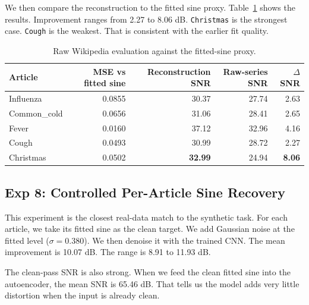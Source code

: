 \documentclass{article}
\begin{document}
We then compare the reconstruction to the fitted sine proxy. Table~\ref{tab:real-eval} shows the results. Improvement ranges from 2.27 to 8.06 dB. \texttt{Christmas} is the strongest case. \texttt{Cough} is the weakest. That is consistent with the earlier fit quality.

\begin{table}[!htbp]
\centering
\caption{Raw Wikipedia evaluation against the fitted-sine proxy.}
\label{tab:real-eval}
\begin{tabular}{lrrrr}
\toprule
Article & MSE vs fitted sine & Reconstruction SNR & Raw-series SNR & $\Delta$SNR \\
\midrule
Influenza    & 0.0855 & 30.37          & 27.74 & 2.63          \\
Common\_cold & 0.0656 & 31.06          & 28.41 & 2.65          \\
Fever        & 0.0160 & 37.12          & 32.96 & 4.16          \\
Cough        & 0.0493 & 30.99          & 28.72 & 2.27          \\
Christmas    & 0.0502 & \textbf{32.99} & 24.94 & \textbf{8.06} \\
\bottomrule
\end{tabular}
\end{table}

\FloatBarrier

\subsection{Exp 8: Controlled Per-Article Sine Recovery}

This experiment is the closest real-data match to the synthetic task. For each article, we take its fitted sine as the clean target. We add Gaussian noise at the fitted level ($\sigma = 0.380$). We then denoise it with the trained CNN. The mean improvement is 10.07 dB. The range is 8.91 to 11.93 dB.

The clean-pass SNR is also strong. When we feed the clean fitted sine into the autoencoder, the mean SNR is 65.46 dB. That tells us the model adds very little distortion when the input is already clean.
\end{document}
